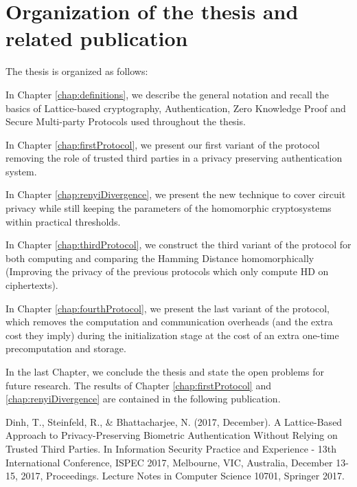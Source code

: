 \section{Organization of the thesis and related publication}
The thesis is organized as follows:
\begin{description}
\item In Chapter \ref{chap:definitions}, we describe the general notation and
  recall the basics of Lattice-based cryptography, Authentication, Zero
  Knowledge Proof and Secure Multi-party Protocols used throughout the
  thesis.
\item In Chapter \ref{chap:firstProtocol}, we present our first variant of the
  protocol removing the role of trusted third parties in a privacy
  preserving authentication system.
\item In Chapter \ref{chap:renyiDivergence}, we present the new technique to
  cover circuit privacy while still keeping the parameters of the homomorphic
  cryptosystems within practical thresholds.
\item In Chapter \ref{chap:thirdProtocol}, we construct the third variant of the
  protocol for both computing and comparing the Hamming Distance
  homomorphically (Improving the privacy of the previous protocols which only compute HD on ciphertexts).
\item In Chapter \ref{chap:fourthProtocol}, we present the last variant of the
  protocol, which removes the computation and communication overheads (and the
  extra cost they imply) during the initialization stage at the cost of an extra one-time precomputation and storage.
\end{description}
\label{sec:introOrganize}

In the last Chapter, we conclude the thesis and state the open problems for
future research. The results of Chapter \ref{chap:firstProtocol} and
\ref{chap:renyiDivergence} are contained in the following publication. 

Dinh, T., Steinfeld, R., \& Bhattacharjee, N. (2017, December). A Lattice-Based Approach to Privacy-Preserving Biometric Authentication Without Relying on Trusted Third Parties. In Information Security Practice and Experience - 13th International Conference, ISPEC 2017, Melbourne, VIC, Australia, December 13-15, 2017, Proceedings. Lecture Notes in Computer Science 10701, Springer 2017.



